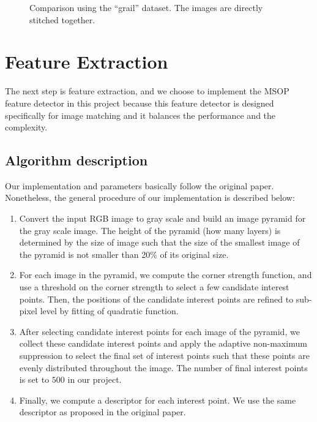 \documentclass[a4paper]{article}
\begin{document}
\begin{figure}[h]
  \centering
  \vspace{0.2cm}
  \caption{Comparison using the ``grail'' dataset. The images are directly stitched together.}
  \label{fig:warp}
\end{figure}

\section{Feature Extraction}
The next step is feature extraction, and we choose to implement the MSOP \cite{brown2005multi} feature detector in this project because this feature detector is designed specifically for image matching and it balances the performance and the complexity.

\subsection{Algorithm description}

Our implementation and parameters basically follow the original paper. Nonetheless, the general procedure of our implementation is described below:
\begin{enumerate}
  \item Convert the input RGB image to gray scale and build an image pyramid for the gray scale image. The height of the pyramid (how many layers) is determined by the size of image such that the size of the smallest image of the pyramid is not smaller than 20\% of its original size.
  \item For each image in the pyramid, we compute the corner strength function, and use a threshold on the corner strength to select a few candidate interest points. Then, the positions of the candidate interest points are refined to sub-pixel level by fitting of quadratic function.
  \item After selecting candidate interest points for each image of the pyramid, we collect these candidate interest points and apply the adaptive non-maximum suppression to select the final set of interest points such that these points are evenly distributed throughout the image. The number of final interest points is set to $500$ in our project.
  \item Finally, we compute a descriptor for each interest point. We use the same descriptor as proposed in the original paper.
\end{enumerate}
\end{document}
